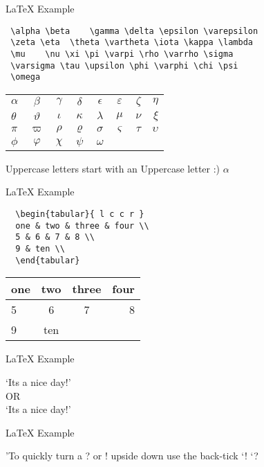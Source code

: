 \begin{frame}[t,fragile]{LaTeX Example}

  \begin{lstlisting}
 \alpha \beta	 \gamma \delta \epsilon \varepsilon
 \zeta \eta	 \theta \vartheta \iota \kappa \lambda
 \mu	\nu \xi \pi \varpi \rho \varrho \sigma
 \varsigma \tau \upsilon \phi \varphi \chi \psi
 \omega
  \end{lstlisting}

\begin{tabular}{ l c c c c c c r }
  $\alpha$ & $\beta$ & $\gamma$ & $\delta$ & $\epsilon$ & $\varepsilon$ & $\zeta$ & $\eta$ \\
  $\theta$ & $\vartheta$ & $\iota$ & $\kappa$ & $\lambda$ & $\mu$ & $\nu$ & $\xi$ \\
  $\pi$ & $\varpi$ & $\rho$ & $\varrho$ & $\sigma$ & $\varsigma$ & $\tau$ & $\upsilon$ \\
  $\phi$ & $\varphi$ & $\chi$ & $\psi$ & $\omega$ \\
\end{tabular}

Uppercase letters start with an Uppercase letter :) $\alpha$

\end{frame}

\begin{frame}[t,fragile]{LaTeX Example}


\begin{lstlisting}
  \begin{tabular}{ l c c r }
  one & two & three & four \\
  5 & 6 & 7 & 8 \\
  9 & ten \\
  \end{tabular}
\end{lstlisting}

\begin{tabular}{ l | c || c r }
one & two & three & four \\ \hline
5 & 6 & 7 & 8 \\
9 & ten \\
\end{tabular}
\end{frame}

\begin{frame}[t,fragile]{LaTeX Example}

  `It\textquotesingle s a nice day!' \\
  OR \\
  `It{\textquotesingle}s a nice day!' \\

\end{frame}

\begin{frame}[t,fragile]{LaTeX Example}

  'To quickly turn a ? or ! upside down use the back-tick `! `? \\

\end{frame}

